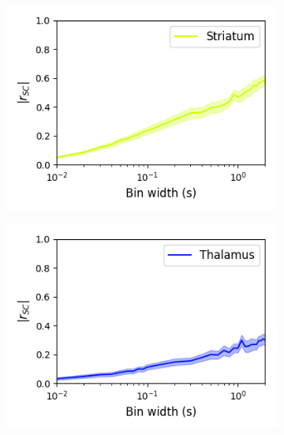 \documentclass[a4paper,12pt]{article}
\theoremstyle{definition}
\begin{document}
\begin{figure}[p]
\begin{subfigure}{0.5\textwidth}
    \includegraphics[width=\textwidth]{figures/bin_width_correlations_striatum_14.png}
  \end{subfigure}
  \begin{subfigure}{0.5\textwidth}
    \centering
    \includegraphics[width=\textwidth]{figures/bin_width_correlations_thalamus_15.png}
  \end{subfigure}
  \begin{subfigure}{0.5\textwidth}
    \centering

\end{subfigure}
\end{figure}
\end{document}
